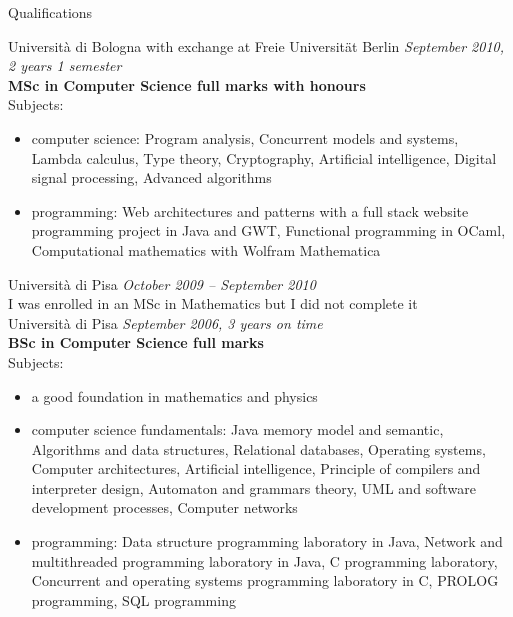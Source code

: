 \documentclass{resume}
\begin{document}
    \begin{rSection}{Qualifications}

        Universit\`a di Bologna with exchange at Freie Universit\"at Berlin \hfill {\em September 2010, 2 years 1 semester} \\
        {\bf MSc in Computer Science full marks with honours}\\
        Subjects:
        \begin{itemize}
            \item computer science:
            Program analysis, Concurrent models and systems, Lambda calculus,
            Type theory, Cryptography, Artificial intelligence, Digital signal processing,
            Advanced algorithms
            \item programming:
            Web architectures and patterns with a full stack website programming project in Java and GWT,
            Functional programming in OCaml, Computational mathematics with Wolfram Mathematica\\
        \end{itemize}


        Universit\`a di Pisa \hfill {\em October 2009 -- September 2010} \\
        I was enrolled in an MSc in Mathematics but I did not complete it\\

        Universit\`a di Pisa \hfill {\em September 2006, 3 years on time} \\
        {\bf BSc in Computer Science full marks}\\
        Subjects:
        \begin{itemize}
            \item a good foundation in mathematics and physics
            \item computer science fundamentals:
            Java memory model and semantic, Algorithms and data structures, Relational databases,
            Operating systems, Computer architectures, Artificial intelligence, Principle of compilers and interpreter design,
            Automaton and grammars theory, UML and software development processes, Computer networks
            \item programming:
            Data structure programming laboratory in Java, Network and multithreaded programming laboratory in Java,
            C programming laboratory, Concurrent and operating systems programming laboratory in C,
            PROLOG programming, SQL programming
        \end{itemize}



\end{rSection}
\end{document}
